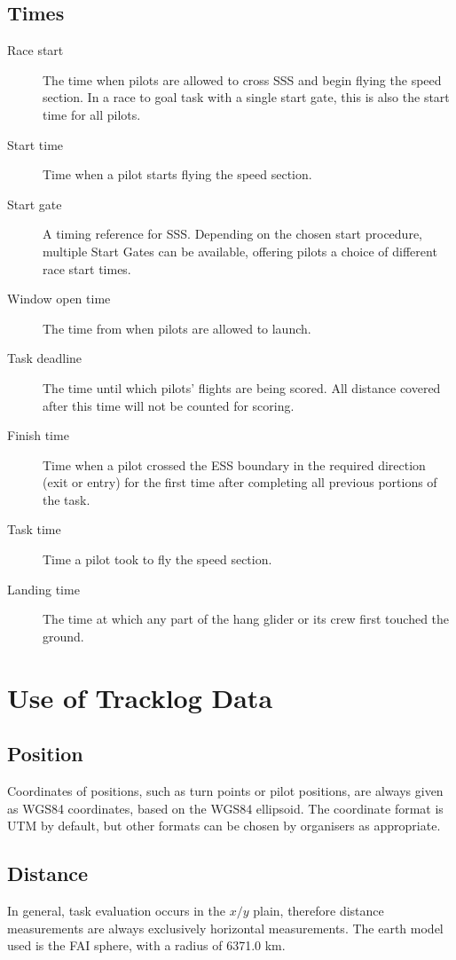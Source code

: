 \documentclass{article}
\begin{document}
\subsection{Times}
\begin{description}
    \item [Race start]
        The time when pilots are allowed to cross SSS and begin flying the
        speed section. In a race to goal task with a single start gate, this is
        also the start time for all pilots.
    \item [Start time]
        Time when a pilot starts flying the speed section.
    \item [Start gate]
        A timing reference for SSS. Depending on the chosen start procedure,
        multiple Start Gates can be available, offering pilots a choice of
        different race start times.
    \item [Window open time]
        The time from when pilots are allowed to launch.
    \item [Task deadline]
        The time until which pilots’ flights are being scored. All distance
        covered after this time will not be counted for scoring.
    \item [Finish time]
        Time when a pilot crossed the ESS boundary in the required direction
        (exit or entry) for the first time after completing all previous
        portions of the task.
    \item [Task time]
        Time a pilot took to fly the speed section.
    \item [Landing time]
        The time at which any part of the hang glider or its crew first touched
        the ground.
\end{description}

\newpage
\section{Use of Tracklog Data}
\subsection{Position}
Coordinates of positions, such as turn points or pilot positions, are always
given as WGS84 coordinates, based on the WGS84 ellipsoid. The coordinate format
is UTM by default, but other formats can be chosen by organisers as
appropriate.

\subsection{Distance}
\label{sec:distance}
In general, task evaluation occurs in the \(x/y\) plain, therefore distance
measurements are always exclusively horizontal measurements. The earth model used
is the FAI sphere, with a radius of 6371.0 km.
\end{document}
